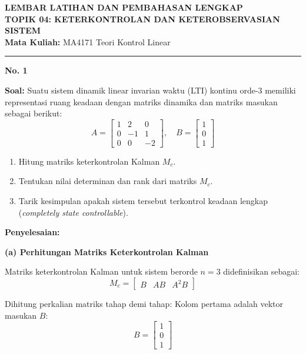 \documentclass[11pt,a4paper]{article}
\begin{document}
\begin{center}
    {\Large \textbf{LEMBAR LATIHAN DAN PEMBAHASAN LENGKAP}}\\[4pt]
    {\large \textbf{TOPIK 04: KETERKONTROLAN DAN KETEROBSERVASIAN SISTEM}}\\[4pt]
    \textbf{Mata Kuliah:} MA4171 Teori Kontrol Linear
\end{center}
\hrule
\vspace{10pt}

\textbf{\large No. 1}

\textbf{Soal:}  
Suatu sistem dinamik linear invarian waktu (LTI) kontinu orde-3 memiliki representasi ruang keadaan dengan matriks dinamika dan matriks masukan sebagai berikut:
$$A = \begin{bmatrix} 1 & 2 & 0 \\ 0 & -1 & 1 \\ 0 & 0 & -2 \end{bmatrix}, \quad B = \begin{bmatrix} 1 \\ 0 \\ 1 \end{bmatrix}$$
\begin{enumerate}[label=(\alph*)]
    \item Hitung matriks keterkontrolan Kalman $M_c$.
    \item Tentukan nilai determinan dan rank dari matriks $M_c$.
    \item Tarik kesimpulan apakah sistem tersebut terkontrol keadaan lengkap (\textit{completely state controllable}).
\end{enumerate}

\textbf{Penyelesaian:}

\textbf{(a) Perhitungan Matriks Keterkontrolan Kalman}

Matriks keterkontrolan Kalman untuk sistem berorde $n = 3$ didefinisikan sebagai:
$$M_c = \begin{bmatrix} B & AB & A^2B \end{bmatrix}$$

Dihitung perkalian matriks tahap demi tahap:
Kolom pertama adalah vektor masukan $B$:
$$B = \begin{bmatrix} 1 \\ 0 \\ 1 \end{bmatrix}$$
\end{document}
